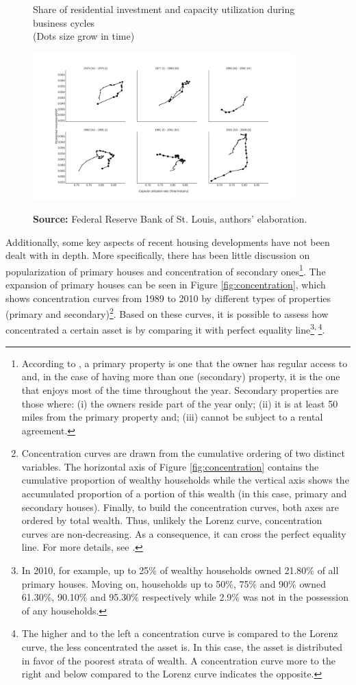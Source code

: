 \documentclass[11pt]{article}
\begin{document}
\begin{figure}[htb]
    \centering
        \caption{Share of residential investment and capacity utilization during business cycles\\\centering (Dots size grow in  time)} 
    \includegraphics[width = 0.9\textwidth]{./figs/cycles.png}
    \label{fig:cycles}
    \caption*{\textbf{Source:} Federal Reserve Bank of St. Louis, authors’ elaboration.}
\end{figure}
Additionally, some key aspects of recent housing developments have not been dealt with in depth.
More specifically, there has been little discussion on popularization of primary houses and concentration of secondary ones\footnote{According to \textcite{us_census_bureau_characteristics_2017}, a primary property is one that the owner has regular access to and, in the case of having more than one (secondary) property, it is the one that enjoys most of the time throughout the year. Secondary properties are those where:
(i) the owners reside part of the year only; (ii) it is at least 50 miles from the primary property and; (iii) cannot be subject to a rental agreement.}. The expansion of primary houses can be seen in Figure \ref{fig:concentration}, which shows concentration curves from 1989 to 2010 by different types of properties (primary and secondary)\footnote{Concentration curves are drawn from the cumulative ordering of two distinct variables. The horizontal axis of Figure \ref{fig:concentration} contains the cumulative proportion of wealthy households while the vertical axis shows the accumulated proportion of a portion of this wealth (in this case, primary and secondary houses). Finally, to build the concentration curves, both axes are ordered by total wealth. Thus, unlikely the Lorenz curve, concentration curves are non-decreasing. As a consequence, it can cross the perfect equality line. For more details, see \textcite{Jann_Concentration_2016}.}. Based on these curves, it is possible to assess how concentrated a certain asset is by comparing it with perfect equality line\footnote{In 2010, for example,  up to 25\% of wealthy households owned 21.80\% of all primary houses. Moving on, households up to 50\%, 75\% and 90\% owned 61.30\%, 90.10\% and  95.30\% respectively while 2.9\% was not in the possession of any households.}\textsuperscript{,}\,\footnote{The higher and to the left a concentration curve is compared to the Lorenz curve, the less concentrated the asset is. In this case, the asset  is distributed in favor of the poorest strata of wealth. A concentration curve more to the right and below compared to the Lorenz curve indicates the opposite.}.
\end{document}
